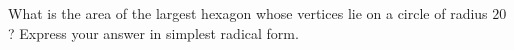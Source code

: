 What is the area of the largest hexagon whose vertices lie on a circle of radius $20$? Express your answer in simplest radical form.
